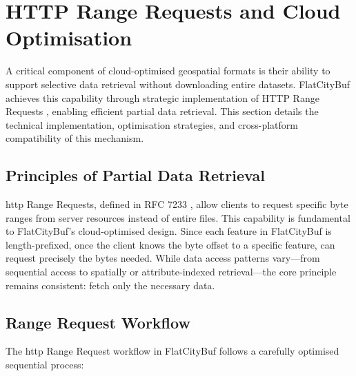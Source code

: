 
\section{HTTP Range Requests and Cloud Optimisation}
\label{methodology:http_range_requests}

A critical component of cloud-optimised geospatial formats is their ability to support selective data retrieval without downloading entire datasets. FlatCityBuf achieves this capability through strategic implementation of HTTP Range Requests \citep{http_range_requests}, enabling efficient partial data retrieval. This section details the technical implementation, optimisation strategies, and cross-platform compatibility of this mechanism.

\subsection{Principles of Partial Data Retrieval}
\label{methodology:http_range_requests:partial_retrieval_principles}

\ac{http} Range Requests, defined in RFC 7233 \citep{rfc_7233}, allow clients to request specific byte ranges from server resources instead of entire files. This capability is fundamental to FlatCityBuf's cloud-optimised design. Since each feature in FlatCityBuf is length-prefixed, once the client knows the byte offset to a specific feature, can request precisely the bytes needed. While data access patterns vary—from sequential access to spatially or attribute-indexed retrieval—the core principle remains consistent: fetch only the necessary data.

\subsection{Range Request Workflow}
\label{methodology:http_range_requests:range_request_workflow}

The \ac{http} Range Request workflow in FlatCityBuf follows a carefully optimised sequential process:


